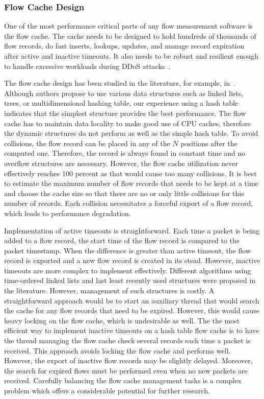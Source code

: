\subsubsection{Flow Cache Design}

One of the most performance critical parts of any flow measurement software is the flow cache. The cache needs to be designed to hold hundreds of thousands of flow records, do fast inserts, lookups, updates, and manage record expiration after active and inactive timeouts. It also needs to be robust and resilient enough to handle excessive workloads during DDoS attacks~\cite{Sadre-2012-Effects}. 

The flow cache design has been studied in the literature, for example, in~\cite{Wang-2011-Memory, Nassopulos-2014-Flow}. Although authors propose to use various data structures such as linked lists, trees, or multidimensional hashing table, our experience using a hash table indicates that the simplest structure provides the best performance. The flow cache has to maintain data locality to make good use of CPU caches, therefore the dynamic structures do not perform as well as the simple hash table. To avoid collisions, the flow record can be placed in any of the $N$ positions after the computed one. Therefore, the record is always found in constant time and no overflow structures are necessary. However, the flow cache utilization never effectively reaches 100 percent as that would cause too many collisions. It is best to estimate the maximum number of flow records that needs to be kept at a time and choose the cache size so that there are no or only little collisions for this number of records. Each collision necessitates a forceful export of a flow record, which leads to performance degradation.

Implementation of active timeouts is straightforward. Each time a packet is being added to a flow record, the start time of the flow record is compared to the packet timestamp. When the difference is greater than active timeout, the flow record is exported and a new flow record is created in its stead. However, inactive timeouts are more complex to implement effectively. Different algorithms using time-ordered linked lists and last least recently used structures were proposed in the literature. However, management of such structures is costly. A straightforward approach would be to start an auxiliary thread that would search the cache for any flow records that need to be expired. However, this would cause heavy locking on the flow cache, which is undesirable as well. The the most efficient way to implement inactive timeouts on a hash table flow cache is to have the thread managing the flow cache check several records each time a packet is received. This approach avoids locking the flow cache and performs well. However, the export of inactive flow records may be slightly delayed. Moreover, the search for expired flows must be performed even when no new packets are received. Carefully balancing the flow cache management tasks is a complex problem which offers a considerable potential for further research.

